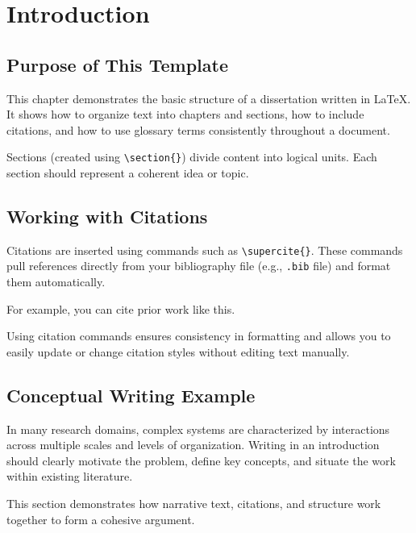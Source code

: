\chapter{Introduction}\label{chap:introduction}


\section{Purpose of This Template}

This chapter demonstrates the basic structure of a dissertation written in \LaTeX{}. It shows how to organize text into chapters and sections, how to include citations, and how to use glossary terms consistently throughout a document.

Sections (created using \texttt{\textbackslash section\{\}}) divide content into logical units. Each section should represent a coherent idea or topic.

\section{Working with Citations}

Citations are inserted using commands such as \texttt{\textbackslash supercite\{\}}. These commands pull references directly from your bibliography file (e.g., \texttt{.bib} file) and format them automatically.

For example, you can cite prior work like this.\supercite{example_reference_1}

Using citation commands ensures consistency in formatting and allows you to easily update or change citation styles without editing text manually.

\section{Conceptual Writing Example}

In many research domains, complex systems are characterized by interactions across multiple scales and levels of organization. Writing in an introduction should clearly motivate the problem, define key concepts, and situate the work within existing literature.\supercite{example_reference_2}

This section demonstrates how narrative text, citations, and structure work together to form a cohesive argument.

